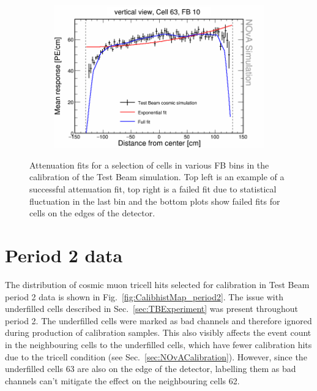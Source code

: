 \begin{figure}[h]
\begin{subfigure}{0.495\textwidth}
  \end{subfigure}
  \begin{subfigure}{0.495\textwidth}
    \includegraphics[width=\linewidth]{Plots/RelativeCalibrationResults/sim_fb10_000_063.png}
  \end{subfigure}
  \caption[Example attenuation fits for simulation]{Attenuation fits for a selection of cells in various \acrshort{FB} bins in the calibration of the Test Beam simulation. Top left is an example of a successful attenuation fit, top right is a failed fit due to statistical fluctuation in the last bin and the bottom plots show failed fits for cells on the edges of the detector.}
  \label{fig:AttenfitResultsSimulation}
\end{figure}

\section{Period 2 data}\label{sec:TBPeriod2}
The distribution of cosmic muon tricell hits selected for calibration in Test Beam period 2 data is shown in Fig.~\ref{fig:CalibhistMap_period2}.
The issue with underfilled cells described in Sec.~\ref{sec:TBExperiment} was present throughout period 2. The underfilled cells were marked as bad channels and therefore ignored during production of calibration samples. This also visibly affects the event count in the neighbouring cells to the underfilled cells, which have fewer calibration hits due to the tricell condition (see Sec.~\ref{sec:NOvACalibration}). However, since the underfilled cells 63 are also on the edge of the detector, labelling them as bad channels can't mitigate the effect on the neighbouring cells 62.

